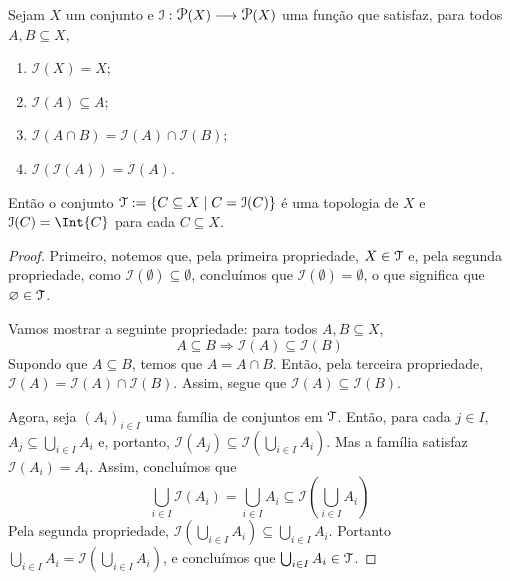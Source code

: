 \begin{prop}
	Sejam $X$ um conjunto e $\mathcal I: \p(X) \to \p(X)$ uma função que satisfaz, para todos $A,B \subseteq X$,
	\begin{enumerate}
	\item $\mathcal I(X) = X$;
	\item $\mathcal I(A) \subseteq A$;
	\item $\mathcal I(A \cap B) = \mathcal I(A) \cap \mathcal I(B)$;
	\item $\mathcal I(\mathcal I(A)) = \mathcal I(A)$.
	\end{enumerate}
	
Então o conjunto $\mathcal{T} := \left\{C \subseteq X \;\middle\vert\; C = \mathcal I(C) \right\}$ é uma topologia de $X$ e $\mathcal I(C) = \Int{C}$ para cada $C \subseteq X$.
\end{prop}
\begin{proof}
	Primeiro, notemos que, pela primeira propriedade, $X \in \mathcal{T}$ e, pela segunda propriedade, como $\mathcal I(\emptyset) \subseteq \emptyset$, concluímos que $\mathcal I(\emptyset)=\emptyset$, o que significa que $\varnothing \in \mathcal{T}$. 	
	
	Vamos mostrar a seguinte propriedade: para todos $A,B \subseteq X$,
	\begin{equation*}
	A \subseteq B \Rightarrow \mathcal I(A) \subseteq \mathcal I(B)
	\end{equation*}
Supondo que $A \subseteq B$, temos que $A = A \cap B$. Então, pela terceira propriedade, $\mathcal I(A) = \mathcal I(A) \cap \mathcal I(B)$. Assim, segue que $\mathcal I(A) \subseteq \mathcal I(B)$.	
	
Agora, seja $(A_i)_{i \in I}$ uma família de conjuntos em $\mathcal{T}$. Então, para cada $j \in I$, $A_j \subseteq \bigcup_{i \in I} A_i$ e, portanto, $\mathcal I(A_j) \subseteq \mathcal I(\bigcup_{i \in I} A_i)$. Mas a família satisfaz $\mathcal I(A_i) = A_i$. Assim, concluímos que
	\begin{equation*}
	\bigcup_{i \in I} \mathcal I(A_i) = \bigcup_{i \in I} A_i \subseteq \mathcal I \left( \bigcup_{i \in I} A_i \right)
	\end{equation*}
Pela segunda propriedade, $\mathcal I(\bigcup_{i \in I} A_i) \subseteq \bigcup_{i \in I} A_i$. Portanto $\bigcup_{i \in I} A_i = \mathcal I(\bigcup_{i \in I} A_i )$, e concluímos que $\bigcup_{i \in I} A_i \in \mathcal{T}$.
	

\end{proof}

